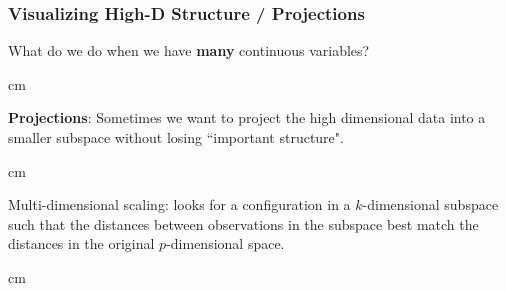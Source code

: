 \documentclass{beamer} %
\begin{document}
\begin{frame}\frametitle{Visualizing High-D Structure / Projections}
	\small
	
	What do we do when we have \textbf{many} continuous variables?
	
	 cm
	
	\textbf{Projections}:  Sometimes we want to project the high dimensional data into a smaller subspace without losing ``important structure".
	
	 cm
	
	Multi-dimensional scaling:  looks for a configuration in a $k$-dimensional subspace such that the distances between observations in the subspace best match the distances in the original $p$-dimensional space.
	
	
	
	 cm
	
\end{frame}
\end{document}
